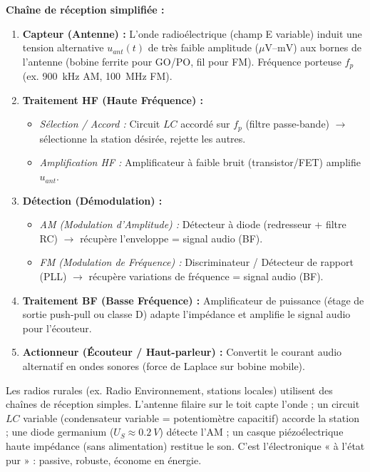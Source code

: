 \documentclass[11pt]{article}
\begin{document}
\textbf{Chaîne de réception simplifiée :}
\begin{enumerate}
\item \textbf{Capteur (Antenne) :} L'onde radioélectrique (champ E variable) induit une tension alternative $u_{ant}(t)$ de très faible amplitude ($\mu\text{V}$--$\text{mV}$) aux bornes de l'antenne (bobine ferrite pour GO/PO, fil pour FM). Fréquence porteuse $f_p$ (ex. \SI{900}{kHz} AM, \SI{100}{MHz} FM).
\item \textbf{Traitement HF (Haute Fréquence) :}
    \begin{itemize}
    \item \emph{Sélection / Accord :} Circuit $LC$ accordé sur $f_p$ (filtre passe-bande) $\rightarrow$ sélectionne la station désirée, rejette les autres.
    \item \emph{Amplification HF :} Amplificateur à faible bruit (transistor/FET) amplifie $u_{ant}$.
    \end{itemize}
\item \textbf{Détection (Démodulation) :}
    \begin{itemize}
    \item \emph{AM (Modulation d'Amplitude) :} Détecteur à diode (redresseur + filtre RC) $\rightarrow$ récupère l'enveloppe = signal audio (BF).
    \item \emph{FM (Modulation de Fréquence) :} Discriminateur / Détecteur de rapport (PLL) $\rightarrow$ récupère variations de fréquence = signal audio (BF).
    \end{itemize}
\item \textbf{Traitement BF (Basse Fréquence) :} Amplificateur de puissance (étage de sortie push-pull ou classe D) adapte l'impédance et amplifie le signal audio pour l'écouteur.
\item \textbf{Actionneur (Écouteur / Haut-parleur) :} Convertit le courant audio alternatif en ondes sonores (force de Laplace sur bobine mobile).
\end{enumerate}

\begin{savaistu}
Les radios rurales (ex. Radio Environnement, stations locales) utilisent des chaînes de réception simples. L'antenne filaire sur le toit capte l'onde ; un circuit $LC$ variable (condensateur variable = potentiomètre capacitif) accorde la station ; une diode germanium ($U_S \approx \SI{0,2}{V}$) détecte l'AM ; un casque piézoélectrique haute impédance (sans alimentation) restitue le son. C'est l'électronique « à l'état pur » : passive, robuste, économe en énergie.
\end{savaistu}
\end{document}
